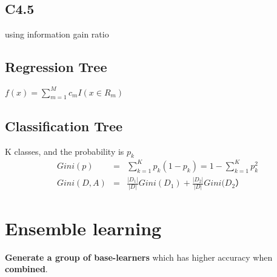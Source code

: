 \documentclass[12pt,a4paper]{article}
\begin{document}
\subsection*{C4.5}
using information gain ratio
\subsection*{Regression Tree}
$f(x)=\sum_{m=1}^{M}c_mI(x\in R_m)$
\subsection*{Classification Tree}
K classes, and the probability is $p_k$\\
\begin{eqnarray*}
Gini(p) &=& \sum_{k=1}^{K}p_k(1-p_k)=1-\sum_{k=1}^{K}p_k^2\\
Gini(D,A) &=& \frac{|D_1|}{|D|}Gini(D_1)+\frac{|D_2|}{|D|}Gini(D_2）
\end{eqnarray*}
\section*{Ensemble learning}
\textbf{Generate a group of base-learners} which has higher accuracy when \textbf{combined}.
\end{document}
